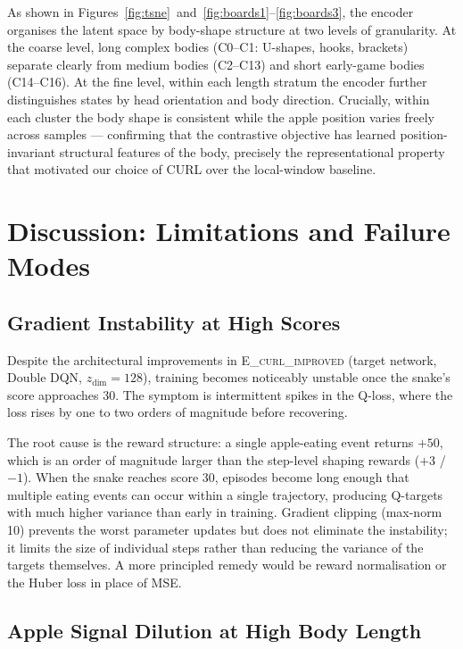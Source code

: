 \documentclass[11pt]{article}
\begin{document}
As shown in Figures~\ref{fig:tsne}~and~\ref{fig:boards1}--\ref{fig:boards3},
the encoder organises the latent space by body-shape structure at two levels
of granularity.
At the coarse level, long complex bodies (C0--C1: U-shapes, hooks, brackets)
separate clearly from medium bodies (C2--C13) and short early-game bodies
(C14--C16).
At the fine level, within each length stratum the encoder further distinguishes
states by head orientation and body direction.
Crucially, within each cluster the body shape is consistent while the apple
position varies freely across samples — confirming that the contrastive
objective has learned position-invariant structural features of the body,
precisely the representational property that motivated our choice of CURL
over the local-window baseline.

\section{Discussion: Limitations and Failure Modes}

\subsection{Gradient Instability at High Scores}

Despite the architectural improvements in \textsc{E\_curl\_improved}
(target network, Double DQN, $z_{\dim}=128$), training becomes noticeably
unstable once the snake's score approaches 30.
The symptom is intermittent spikes in the Q-loss, where the loss rises by
one to two orders of magnitude before recovering.

The root cause is the reward structure: a single apple-eating event returns
$+50$, which is an order of magnitude larger than the step-level shaping
rewards ($+3$ / $-1$).
When the snake reaches score 30, episodes become long enough that multiple
eating events can occur within a single trajectory, producing Q-targets with
much higher variance than early in training.
Gradient clipping (max-norm 10) prevents the worst parameter updates but
does not eliminate the instability; it limits the size of individual steps
rather than reducing the variance of the targets themselves.
A more principled remedy would be reward normalisation or the Huber loss in
place of MSE.

\subsection{Apple Signal Dilution at High Body Length}
\end{document}
